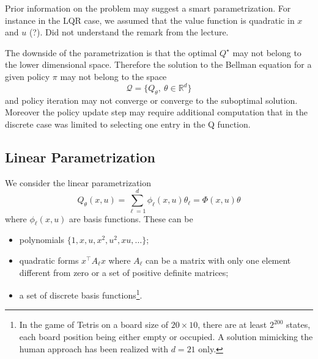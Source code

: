 Prior information on the problem may suggest a smart parametrization. For instance in the LQR case, we assumed that the value function is quadratic in $x$ and $u$ (?). Did not understand the remark from the lecture.

The downside of the parametrization is that the optimal $Q^\star$  may not belong to the lower dimensional space. Therefore the solution to the Bellman equation for a given policy $\pi$ may not belong to the space
\begin{equation*}
  \mathcal{Q} = \{Q_\theta,\ \theta\in\mathbb{R}^d\}
\end{equation*}
and policy iteration may not converge or converge to the suboptimal solution. Moreover the policy update step may require additional computation that in the discrete case was limited to selecting one entry in the Q function.

\subsection{Linear Parametrization}
\label{sec:RL-linear-parametrization}

We consider the linear parametrization
\begin{equation}
  \label{eq:Q-linear-parametrization}
  Q_\theta(x,u) = \sum_{\ell=1}^d \phi_\ell(x,u)\theta_\ell = \Phi(x,u)\theta
\end{equation}
where $\phi_\ell(x,u)$ are basis functions. These can be
\begin{itemize}
\item polynomials $\{1, x, u, x^2, u^2, xu,\ldots\}$;
\item quadratic forms $x^\top A_\ell x$ where $A_\ell$ can be a matrix with only one element different from zero or a set of positive definite matrices;
\item a set of discrete basis functions\footnote{In the game of Tetris on a board size of $20\times 10$, there are at least $2^{200}$ states, each board position being either empty or occupied. A solution mimicking the human approach has been realized with $d=21$ only.}.
\end{itemize}

